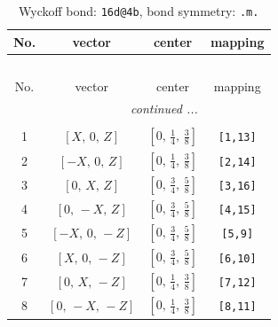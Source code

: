 \documentclass[fleqn,8pt]{jsarticle}
\begin{document}
\begin{longtable}{cccc}
\caption{Wyckoff bond: {\tt 16d@4b}, bond symmetry: {\tt .m.}}
 \\
 \hline \hline
No. & vector & center & mapping \\ \hline \endfirsthead

\multicolumn{3}{l}{\tablename\ \thetable{}} \\
 \hline \hline
No. & vector & center & mapping \\ \hline \endhead

 \hline \hline
\multicolumn{3}{r}{\footnotesize\it continued ...} \\ \endfoot

 \hline \hline
\multicolumn{3}{r}{} \\ \endlastfoot

1 & $\left[ X,\, 0,\, Z \right]$ & $\left[ 0,\, \frac{1}{4},\, \frac{3}{8} \right]$ & {\tt [1,13]} \\ \hline
2 & $\left[ - X,\, 0,\, Z \right]$ & $\left[ 0,\, \frac{1}{4},\, \frac{3}{8} \right]$ & {\tt [2,14]} \\ \hline
3 & $\left[ 0,\, X,\, Z \right]$ & $\left[ 0,\, \frac{3}{4},\, \frac{5}{8} \right]$ & {\tt [3,16]} \\ \hline
4 & $\left[ 0,\, - X,\, Z \right]$ & $\left[ 0,\, \frac{3}{4},\, \frac{5}{8} \right]$ & {\tt [4,15]} \\ \hline
5 & $\left[ - X,\, 0,\, - Z \right]$ & $\left[ 0,\, \frac{3}{4},\, \frac{5}{8} \right]$ & {\tt [5,9]} \\ \hline
6 & $\left[ X,\, 0,\, - Z \right]$ & $\left[ 0,\, \frac{3}{4},\, \frac{5}{8} \right]$ & {\tt [6,10]} \\ \hline
7 & $\left[ 0,\, X,\, - Z \right]$ & $\left[ 0,\, \frac{1}{4},\, \frac{3}{8} \right]$ & {\tt [7,12]} \\ \hline
8 & $\left[ 0,\, - X,\, - Z \right]$ & $\left[ 0,\, \frac{1}{4},\, \frac{3}{8} \right]$ & {\tt [8,11]} \\
\end{longtable}
\renewcommand{\arraystretch}{1.2}
\end{document}

